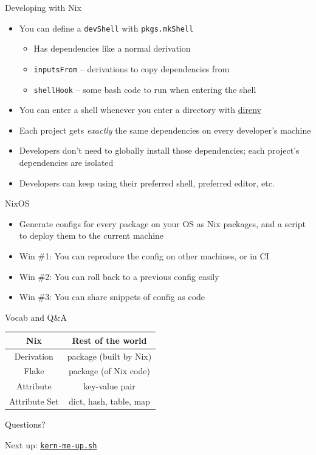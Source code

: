 \documentclass[aspectratio=169, notes]{beamer}
\begin{document}
\begin{frame}{Developing with Nix}
	\begin{itemize}
		\item You can define a \texttt{devShell} with \texttt{pkgs.mkShell}
		      \begin{itemize}
			      \item Has dependencies like a normal derivation
			      \item \texttt{inputsFrom} -- derivations to copy dependencies from
			      \item \texttt{shellHook} -- some bash code to run when entering the shell
		      \end{itemize}
		\item You can enter a shell whenever you enter a directory with \href{https://direnv.net/}{direnv}
		      \vspace{1cm}
		\item Each project gets \emph{exactly} the same dependencies on every developer's machine
		\item Developers don't need to globally install those dependencies; each project's dependencies are isolated
		\item Developers can keep using their preferred shell, preferred editor, etc.
	\end{itemize}
\end{frame}

\begin{frame}{NixOS}
	\begin{itemize}
		\item Generate configs for every package on your OS as Nix packages, and a script to deploy them to the current machine
		\item Win \#1: You can reproduce the config on other machines, or in CI
		\item Win \#2: You can roll back to a previous config easily
		\item Win \#3: You can share snippets of config as code
	\end{itemize}
\end{frame}

\begin{frame}{Vocab and Q\&A}
	\begin{center}
		\begin{tabular}{ c | c }
			Nix           & Rest of the world      \\
			\hline\hline
			Derivation    & package (built by Nix) \\
			Flake         & package (of Nix code)  \\
			Attribute     & key-value pair         \\
			Attribute Set & dict, hash, table, map
		\end{tabular}
	\end{center}
	\vspace{1cm}
	\begin{center}
		{\huge Questions?}
	\end{center}
	\vspace{1cm}
	{\hfill Next up: \href{https://github.com/UMN-Kernel-Object/scripts/blob/main/kern-me-up.sh}{\texttt{kern-me-up.sh}}}
\end{frame}
\end{document}
